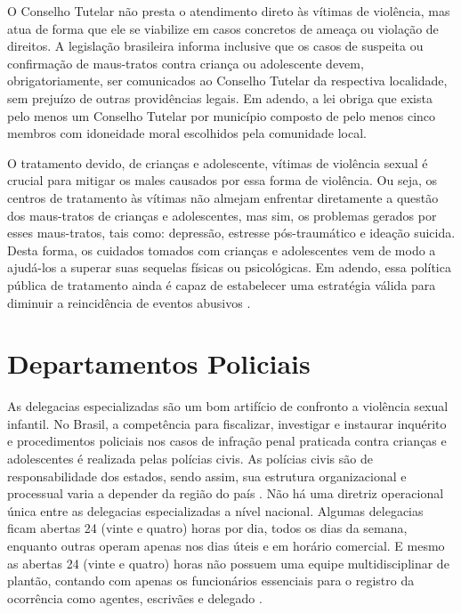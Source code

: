 O Conselho Tutelar não presta o atendimento direto às vítimas de violência, mas atua de forma que ele se viabilize em casos concretos de ameaça ou violação de direitos. A legislação brasileira informa inclusive que os casos de suspeita ou confirmação de maus-tratos contra criança ou adolescente devem, obrigatoriamente, ser comunicados ao Conselho Tutelar da respectiva localidade, sem prejuízo de outras providências legais. Em adendo, a lei obriga que exista pelo menos um Conselho Tutelar por município composto de pelo menos cinco membros com idoneidade moral escolhidos pela comunidade local. 

O tratamento devido, de crianças e adolescente, vítimas de violência sexual é crucial para mitigar os males causados por essa forma de violência. Ou seja, os centros de tratamento às vítimas não almejam enfrentar diretamente a questão dos maus-tratos de crianças e adolescentes, mas sim, os problemas gerados por esses maus-tratos, tais como: depressão, estresse pós-traumático e ideação suicida. Desta forma, os cuidados tomados com crianças e adolescentes vem de modo a ajudá-los a superar suas sequelas físicas ou psicológicas. Em adendo, essa política pública de tratamento ainda é capaz de estabelecer uma estratégia válida para diminuir a reincidência de eventos abusivos \cite{costa2019maus}.


\section{Departamentos Policiais}\label{sec:dp}

As delegacias especializadas são um bom artifício de confronto a violência sexual infantil. No Brasil, a competência para fiscalizar, investigar e instaurar inquérito e procedimentos policiais nos casos de infração penal praticada contra crianças e adolescentes é realizada pelas polícias civis. As polícias civis são de responsabilidade dos estados, sendo assim, sua estrutura organizacional e processual varia a depender da região do país \cite{rodrigues2014violencia}. Não há uma diretriz operacional única entre as delegacias especializadas a nível nacional. Algumas delegacias ficam abertas 24 (vinte e quatro) horas por dia, todos os dias da semana, enquanto outras operam apenas nos dias úteis e em horário comercial. E mesmo as abertas 24 (vinte e quatro) horas não possuem uma equipe multidisciplinar de plantão, contando com apenas os funcionários essenciais para o registro da ocorrência como agentes, escrivães e delegado \cite{brasil2016estudo}.

